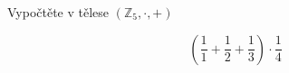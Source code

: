 Vypočtěte v tělese $(\mathbb{Z}_{5}, \cdot ,+)$

$$(\frac{1}{1}+\frac{1}{2}+\frac{1}{3})\cdot \frac{1}{4}$$
